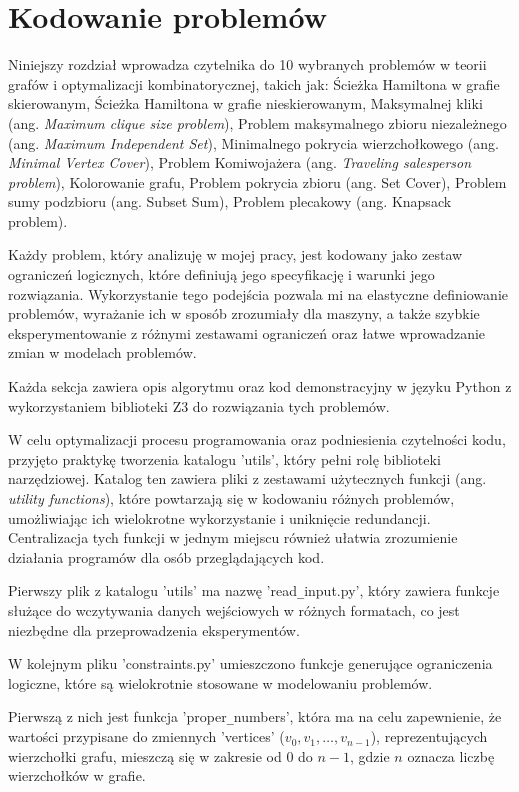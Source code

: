 \chapter{Kodowanie problemów}

Niniejszy rozdział wprowadza czytelnika do 10 wybranych problemów w teorii grafów i optymalizacji kombinatorycznej, takich jak:
Ścieżka Hamiltona w grafie skierowanym,
Ścieżka Hamiltona w grafie nieskierowanym, 
Maksymalnej kliki (ang. \textit{Maximum clique size problem}), 
Problem maksymalnego zbioru niezależnego (ang. \textit{Maximum Independent Set}),
Minimalnego pokrycia wierzchołkowego (ang. \textit{Minimal Vertex Cover}), 
Problem Komiwojażera (ang. \textit{Traveling salesperson problem}), 
Kolorowanie grafu, 
Problem pokrycia zbioru (ang. Set Cover), 
Problem sumy podzbioru (ang. Subset Sum), 
Problem plecakowy (ang. Knapsack problem).

Każdy problem, który analizuję w mojej pracy, jest kodowany jako zestaw ograniczeń logicznych, które definiują jego specyfikację i warunki jego rozwiązania. Wykorzystanie tego podejścia pozwala mi na elastyczne definiowanie problemów, wyrażanie ich w sposób zrozumiały dla maszyny, a także szybkie eksperymentowanie z różnymi zestawami ograniczeń oraz łatwe wprowadzanie zmian w modelach problemów.

Każda sekcja zawiera opis algorytmu oraz kod demonstracyjny w języku Python z wykorzystaniem biblioteki Z3 do rozwiązania tych problemów.

W celu optymalizacji procesu programowania oraz podniesienia czytelności kodu, przyjęto praktykę tworzenia katalogu 'utils', który pełni rolę biblioteki narzędziowej. Katalog ten zawiera pliki z zestawami użytecznych funkcji (ang. \textit{utility functions}), które powtarzają się w kodowaniu różnych problemów, umożliwiając ich wielokrotne wykorzystanie i uniknięcie redundancji. Centralizacja tych funkcji w jednym miejscu również ułatwia zrozumienie działania programów dla osób przeglądających kod. 

Pierwszy plik z katalogu 'utils' ma nazwę 'read\verb|_|input.py', który zawiera funkcje służące do wczytywania danych wejściowych w różnych formatach, co jest niezbędne dla przeprowadzenia eksperymentów.

W kolejnym pliku 'constraints.py' umieszczono funkcje generujące ograniczenia logiczne, które są wielokrotnie stosowane w modelowaniu problemów.

Pierwszą z nich jest funkcja 'proper\verb|_|numbers', która ma na celu zapewnienie, że wartości przypisane do zmiennych 'vertices' ($v_0, v_1, …, v_{n-1}$), reprezentujących wierzchołki grafu, mieszczą się w zakresie od $0$ do $n - 1$, gdzie $n$ oznacza liczbę wierzchołków w grafie. 

